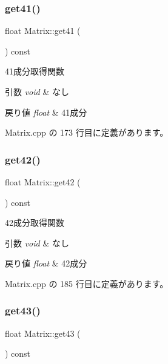 \subsubsection{\texorpdfstring{get41()}{get41()}}
{\footnotesize\ttfamily float Matrix\+::get41 (\begin{DoxyParamCaption}{ }\end{DoxyParamCaption}) const}



41成分取得関数 


\begin{DoxyParams}{引数}
{\em void} & なし \\
\hline
\end{DoxyParams}

\begin{DoxyRetVals}{戻り値}
{\em float} & 41成分 \\
\hline
\end{DoxyRetVals}


 Matrix.\+cpp の 173 行目に定義があります。

\mbox{\label{class_matrix_a99f94d1870205989ca96695a430bd6d6}} 
\subsubsection{\texorpdfstring{get42()}{get42()}}
{\footnotesize\ttfamily float Matrix\+::get42 (\begin{DoxyParamCaption}{ }\end{DoxyParamCaption}) const}



42成分取得関数 


\begin{DoxyParams}{引数}
{\em void} & なし \\
\hline
\end{DoxyParams}

\begin{DoxyRetVals}{戻り値}
{\em float} & 42成分 \\
\hline
\end{DoxyRetVals}


 Matrix.\+cpp の 185 行目に定義があります。

\mbox{\label{class_matrix_aa72989c74eeeb117ba6dc4b8cc7af619}} 
\subsubsection{\texorpdfstring{get43()}{get43()}}
{\footnotesize\ttfamily float Matrix\+::get43 (\begin{DoxyParamCaption}{ }\end{DoxyParamCaption}) const}



